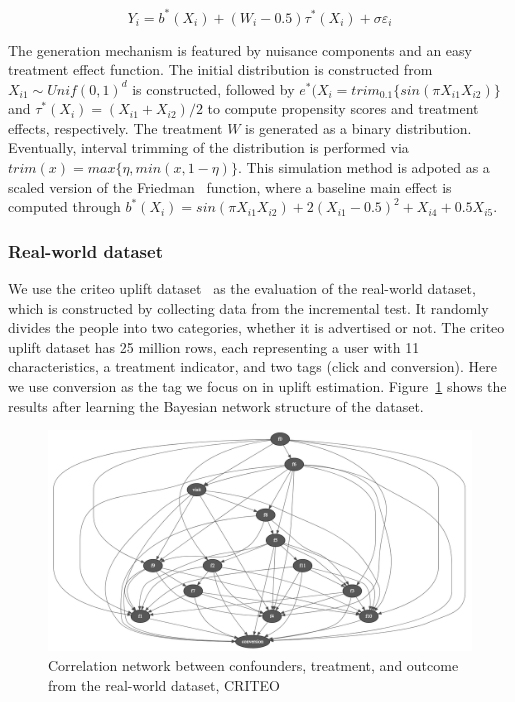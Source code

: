 \documentclass[sigconf,screen]{acmart}
\begin{document}
\begin{equation}
    Y_{i}=b^{*}\left(X_{i}\right)+\left(W_{i}-0.5\right) \tau^{*}\left(X_{i}\right)+\sigma \varepsilon_{i}
\end{equation}

The generation mechanism is featured by nuisance components  and an easy treatment effect function.  The initial distribution is constructed from $X_{i1} \sim Unif(0, 1)^d$ is constructed, followed by $e^\ast(X_{i} = trim_{0.1}\{sin(\pi X_{i1}X_{i2})\}$ and $\tau^\ast(X_{i}) = (X_{i1}+X_{i2})/2$ to compute propensity scores and treatment effects, respectively. The treatment $W$ is generated as a binary distribution. Eventually, interval trimming of the distribution is performed via $trim (x) = max\{\eta, min(x, 1 -\eta)\}$. This simulation method is adpoted as a scaled version of the Friedman~\citep{Friedman} function, where a baseline main effect is computed through $b^\ast(X_{i}) = sin(\pi X_{i1}X_{i2}) + 2(X_{i1} - 0.5)^2 + X_{i4} + 0.5X_{i5}$.
        

\subsubsection{Real-world dataset}
We use the criteo uplift dataset~\citep{uplift_modeling} as the evaluation of the real-world dataset, which is constructed by collecting data from the incremental test. It randomly divides the people into two categories, whether it is advertised or not. The criteo uplift dataset has 25 million rows, each representing a user with 11 characteristics, a treatment indicator, and two tags (click and conversion). Here we use conversion as the tag we focus on in uplift estimation. Figure~\ref{criteo_bn} shows the results after learning the Bayesian network structure of the dataset.

\begin{figure}[h]
\begin{center}
\includegraphics[width=\linewidth]{Fig/criteo_bn.png}
\end{center}
\caption{Correlation network between confounders, treatment, and outcome from the real-world dataset, CRITEO}
\label{criteo_bn}
\end{figure}
\end{document}
